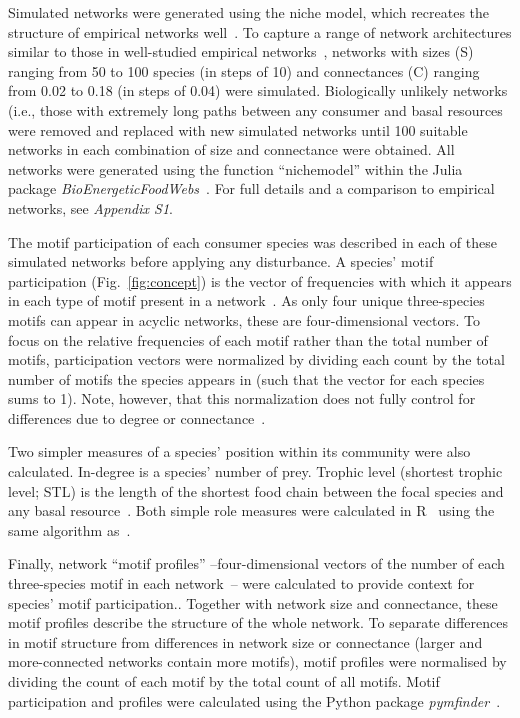\documentclass[12pt]{article}
\begin{document}
\begin{spacing}{1.0}
        Simulated networks were generated using the niche model, which recreates the structure of empirical networks well~\citep{Williams2000,Stouffer2007}.
        To capture a range of network architectures similar to those in well-studied empirical networks~\citep{Dunne2002,Dunne2002e}, networks with sizes (S) ranging from 50 to 100 species (in steps of 10) and connectances (C) ranging from 0.02 to 0.18 (in steps of 0.04) were simulated. 
        Biologically unlikely networks (i.e., those with extremely long paths between any consumer and basal resources~\citep{Borrelli2014} were removed and replaced with new simulated networks until 100 suitable networks in each combination of size and connectance were obtained.
        All networks were generated using the function ``nichemodel'' within the Julia~\citep{Bezanson2017julia} package \emph{BioEnergeticFoodWebs}~\citep{bioenergfw,Delmas2017}.     
        For full details and a comparison to empirical networks, see \emph{Appendix S1}.

        
        The motif participation of each consumer species was described in each of these simulated networks before applying any disturbance. 
        A species' motif participation (Fig.~\ref{fig:concept}) is the vector of frequencies with which it appears in each type of motif present in a network~\citep{Stouffer2012}.
        As only four unique three-species motifs can appear in acyclic networks, these are four-dimensional vectors. 
        To focus on the relative frequencies of each motif rather than the total number of motifs, participation vectors were normalized by dividing each count by the total number of motifs the species appears in (such that the vector for each species sums to 1).
        Note, however, that this normalization does not fully control for differences due to degree or connectance~\citep{Cirtwill2022Oikos}. 


        Two simpler measures of a species' position within its community were also calculated.
        In-degree is a species' number of prey.
        Trophic level (shortest trophic level; STL) is the length of the shortest food chain between the focal species and any basal resource~\citep{Williams2004}.
        Both simple role measures were calculated in R~\citep{R} using the same algorithm as~\citet{Eklof2013}.

        
        Finally, network ``motif profiles'' --four-dimensional vectors of the number of each three-species motif in each network~\citep{Stouffer2012}-- were calculated to provide context for species' motif participation..
        Together with network size and connectance, these motif profiles describe the structure of the whole network.
        To separate differences in motif structure from differences in network size or connectance (larger and more-connected networks contain more motifs), motif profiles were normalised by dividing the count of each motif by the total count of all motifs. 
        Motif participation and profiles were calculated using the Python package \emph{pymfinder}~\citep{pymfinder}.


\end{spacing}
\end{document}
